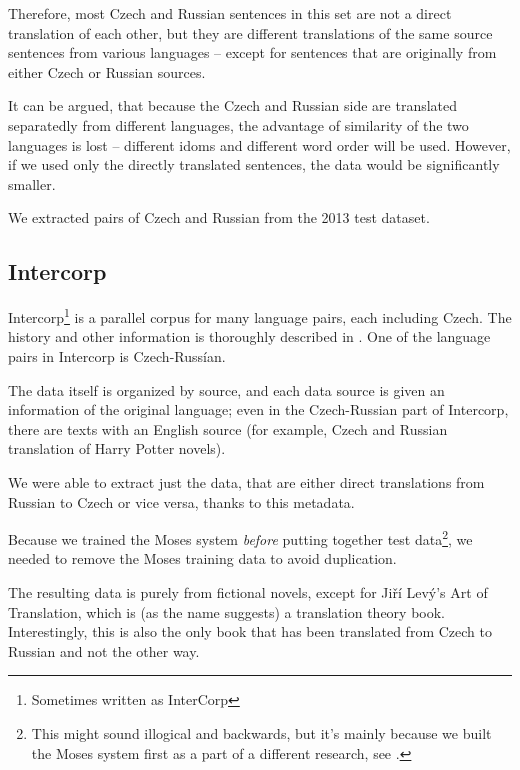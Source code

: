 Therefore, most Czech and Russian sentences in this set are not a direct translation of each other, but they are different translations of the same source sentences from various languages -- except for sentences that are originally from either Czech or Russian sources. 

It can be argued, that because the Czech and Russian side are translated separatedly from different languages, the advantage of similarity of the two languages is lost -- different idoms and different word order will be used.
However, if we used only the directly translated sentences, the data would be significantly smaller. 

We extracted pairs of Czech and Russian from the 2013 test dataset.




\subsection{Intercorp}
\label{intercorp_p1}
Intercorp\footnote{Sometimes written as InterCorp} is a parallel corpus for many language pairs, each including Czech. The history and other information is thoroughly described in \cite{intercorp}. One of the language pairs in Intercorp is Czech-Russían.

The data itself is organized by source, and each data source is given an information of the original language; even in the Czech-Russian part of Intercorp, there are texts with an English source (for example, Czech and Russian translation of Harry Potter novels). 

We were able to extract just the data, that are either direct translations from Russian to Czech or vice versa, thanks to this metadata.

Because we trained the Moses system \emph{before} putting together test data\footnote{This might sound illogical and backwards, but it's mainly because we built the Moses system first as a part of a different research, see \cite{mujpaper}.},
we needed to remove the Moses training data to avoid duplication. 

The resulting data is purely from fictional novels, except for Jiří Levý's Art of Translation, which is (as the name suggests) a translation theory book. Interestingly, this is also the only book that has been translated from Czech to Russian and not the other way.

